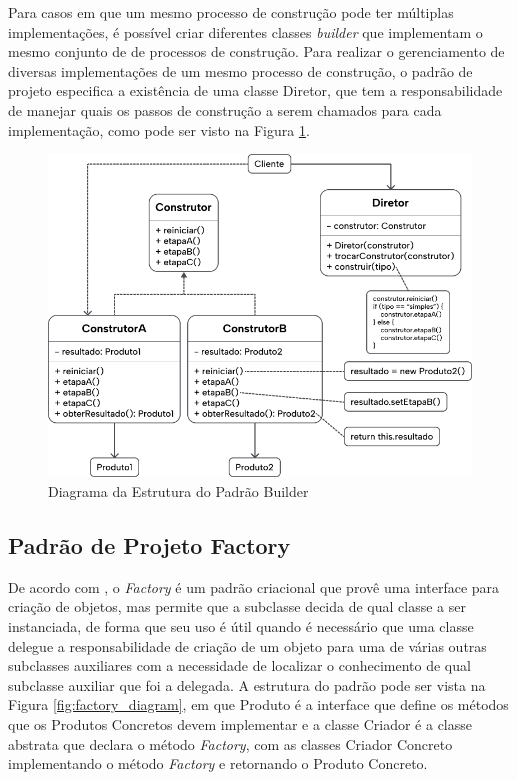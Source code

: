 \documentclass[12pt, %
openright, 
oneside, %
a4paper,    %
brazil]{facom-ufu-abntex2}
\begin{document}
Para casos em que um mesmo processo de construção pode ter múltiplas implementações, é possível criar diferentes classes \textit{builder} que implementam o mesmo conjunto de de processos de construção. Para realizar o gerenciamento de diversas implementações de um mesmo processo de construção, o padrão de projeto especifica a existência de uma classe Diretor, que tem a responsabilidade de manejar quais os passos de construção a serem chamados para cada implementação, como pode ser visto na Figura \ref{fig:builder_diagram}.

\begin{figure}[ht]
    \centering
    \includegraphics[width=.65\textwidth]{figures/bibliographical_review/builder_diagram.png}
    \caption{Diagrama da Estrutura do Padrão Builder}
    \label{fig:builder_diagram}
\end{figure}

\subsection{Padrão de Projeto Factory}

De acordo com , o \textit{Factory} é um padrão criacional que provê uma interface para criação de objetos, mas permite que a subclasse decida de qual classe a ser instanciada, de forma que seu uso é útil quando é necessário que uma classe delegue a responsabilidade de criação de um objeto para uma de várias outras subclasses auxiliares com a necessidade de localizar o conhecimento de qual subclasse auxiliar que foi a delegada. A estrutura do padrão pode ser vista na Figura \ref{fig:factory_diagram}, em que Produto é a interface que define os métodos que os Produtos Concretos devem implementar e a classe Criador é a classe abstrata que declara o método \textit{Factory}, com as classes Criador Concreto implementando o método \textit{Factory} e retornando o Produto Concreto.
\end{document}
